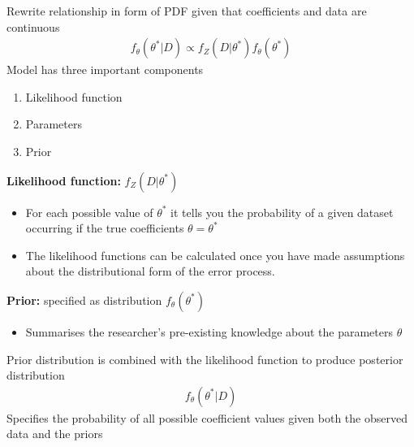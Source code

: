 \documentclass{beamer}
\begin{document}
\begin{frame}
  Rewrite relationship in form of PDF given that coefficients and data are continuous
  \begin{align}
    f_\theta(\theta^* | D) \propto f_Z(D | \theta^*)f_\theta(\theta^*)
\end{align}
 Model has three important components
 \begin{enumerate}
   \item Likelihood function
   \item Parameters
   \item Prior
 \end{enumerate}  
\end{frame}

\begin{frame}
  \textbf{Likelihood function:} $f_Z(D | \theta^*)$ 
    \begin{itemize}
      \item For each possible value of $\theta^*$ it tells you the probability of a given dataset occurring if the true coefficients $\theta= \theta^*$
      \item The likelihood functions can be calculated once you have made assumptions about the distributional form of the error process.
    \end{itemize}
    \medskip
    \textbf{Prior:} specified as distribution $f_\theta(\theta^*)$
    \begin{itemize}
      \item Summarises the researcher's pre-existing knowledge about the parameters $\theta$
    \end{itemize}
    Prior distribution is combined with the likelihood function to produce posterior distribution
    \begin{align}
      f_\theta(\theta^* | D)
    \end{align}
    Specifies the probability of all possible coefficient values given both the observed data and the priors
\end{frame}
\end{document}
